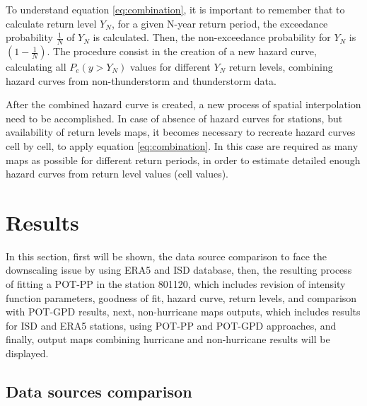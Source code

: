 \documentclass[12pt,oneside]{reedthesis}
\begin{document}
To understand equation \eqref{eq:combination}, it is important to remember that to calculate return level \(Y_N\), for a given N-year return period, the exceedance probability \(\frac{1}{N}\) of \(Y_N\) is calculated. Then, the non-exceedance probability for \(Y_N\) is \(\left(1-\frac{1}{N}\right)\). The procedure consist in the creation of a new hazard curve, calculating all \(P_e(y>Y_N)\) values for different \(Y_N\) return levels, combining hazard curves from non-thunderstorm and thunderstorm data.

After the combined hazard curve is created, a new process of spatial interpolation need to be accomplished. In case of absence of hazard curves for stations, but availability of return levels maps, it becomes necessary to recreate hazard curves cell by cell, to apply equation \eqref{eq:combination}. In this case are required as many maps as possible for different return periods, in order to estimate detailed enough hazard curves from return level values (cell values).

\hypertarget{rmd-results}{%
\chapter{Results}\label{rmd-results}}

In this section, first will be shown, the data source comparison to face the downscaling issue by using ERA5 and ISD database, then, the resulting process of fitting a POT-PP in the station 801120, which includes revision of intensity function parameters, goodness of fit, hazard curve, return levels, and comparison with POT-GPD results, next, non-hurricane maps outputs, which includes results for ISD and ERA5 stations, using POT-PP and POT-GPD approaches, and finally, output maps combining hurricane and non-hurricane results will be displayed.

\hypertarget{data-sources-comparison}{%
\section{Data sources comparison}\label{data-sources-comparison}}
\end{document}
